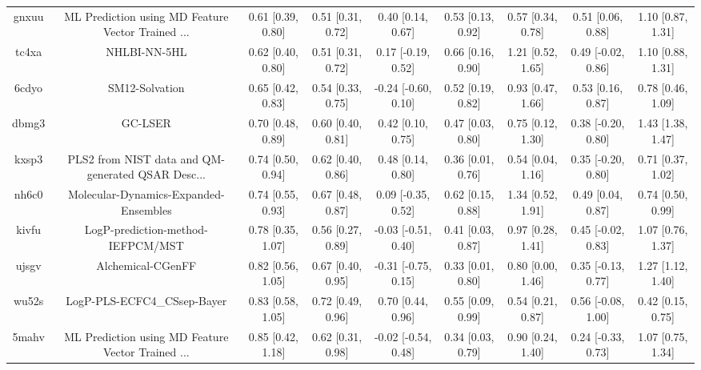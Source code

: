 \documentclass{article}
\begin{document}
\begin{center}
\begin{longtable}{|ccccccccc|}
 gnxuu &  ML Prediction using MD Feature Vector Trained ... &  0.61 [0.39, 0.80] &  0.51 [0.31, 0.72] &     0.40 [0.14, 0.67] &  0.53 [0.13, 0.92] &    0.57 [0.34, 0.78] &    0.51 [0.06, 0.88] &     1.10 [0.87, 1.31] \\
 tc4xa &                                       NHLBI-NN-5HL &  0.62 [0.40, 0.80] &  0.51 [0.31, 0.72] &    0.17 [-0.19, 0.52] &  0.66 [0.16, 0.90] &    1.21 [0.52, 1.65] &   0.49 [-0.02, 0.86] &     1.10 [0.88, 1.31] \\
 6cdyo &                                     SM12-Solvation &  0.65 [0.42, 0.83] &  0.54 [0.33, 0.75] &   -0.24 [-0.60, 0.10] &  0.52 [0.19, 0.82] &    0.93 [0.47, 1.66] &    0.53 [0.16, 0.87] &     0.78 [0.46, 1.09] \\
 dbmg3 &                                            GC-LSER &  0.70 [0.48, 0.89] &  0.60 [0.40, 0.81] &     0.42 [0.10, 0.75] &  0.47 [0.03, 0.80] &    0.75 [0.12, 1.30] &   0.38 [-0.20, 0.80] &     1.43 [1.38, 1.47] \\
 kxsp3 &  PLS2 from NIST data and QM-generated QSAR Desc... &  0.74 [0.50, 0.94] &  0.62 [0.40, 0.86] &     0.48 [0.14, 0.80] &  0.36 [0.01, 0.76] &    0.54 [0.04, 1.16] &   0.35 [-0.20, 0.80] &     0.71 [0.37, 1.02] \\
 nh6c0 &              Molecular-Dynamics-Expanded-Ensembles &  0.74 [0.55, 0.93] &  0.67 [0.48, 0.87] &    0.09 [-0.35, 0.52] &  0.62 [0.15, 0.88] &    1.34 [0.52, 1.91] &    0.49 [0.04, 0.87] &     0.74 [0.50, 0.99] \\
 kivfu &                  LogP-prediction-method-IEFPCM/MST &  0.78 [0.35, 1.07] &  0.56 [0.27, 0.89] &   -0.03 [-0.51, 0.40] &  0.41 [0.03, 0.87] &    0.97 [0.28, 1.41] &   0.45 [-0.02, 0.83] &     1.07 [0.76, 1.37] \\
 ujsgv &                                  Alchemical-CGenFF &  0.82 [0.56, 1.05] &  0.67 [0.40, 0.95] &   -0.31 [-0.75, 0.15] &  0.33 [0.01, 0.80] &    0.80 [0.00, 1.46] &   0.35 [-0.13, 0.77] &     1.27 [1.12, 1.40] \\
 wu52s &                        LogP-PLS-ECFC4\_CSsep-Bayer &  0.83 [0.58, 1.05] &  0.72 [0.49, 0.96] &     0.70 [0.44, 0.96] &  0.55 [0.09, 0.99] &    0.54 [0.21, 0.87] &   0.56 [-0.08, 1.00] &     0.42 [0.15, 0.75] \\
 5mahv &  ML Prediction using MD Feature Vector Trained ... &  0.85 [0.42, 1.18] &  0.62 [0.31, 0.98] &   -0.02 [-0.54, 0.48] &  0.34 [0.03, 0.79] &    0.90 [0.24, 1.40] &   0.24 [-0.33, 0.73] &     1.07 [0.75, 1.34] \\

\end{longtable}
\end{center}
\end{document}
